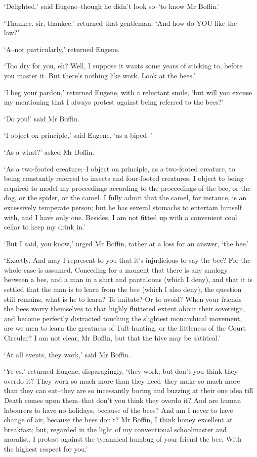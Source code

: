 ‘Delighted,’ said Eugene--though he didn’t look so--‘to know Mr Boffin.’

‘Thankee, sir, thankee,’ returned that gentleman. ‘And how do YOU like
the law?’

‘A--not particularly,’ returned Eugene.

‘Too dry for you, eh? Well, I suppose it wants some years of sticking
to, before you master it. But there’s nothing like work. Look at the
bees.’

‘I beg your pardon,’ returned Eugene, with a reluctant smile, ‘but will
you excuse my mentioning that I always protest against being referred to
the bees?’

‘Do you!’ said Mr Boffin.

‘I object on principle,’ said Eugene, ‘as a biped--’

‘As a what?’ asked Mr Boffin.

‘As a two-footed creature;--I object on principle, as a two-footed
creature, to being constantly referred to insects and four-footed
creatures. I object to being required to model my proceedings according
to the proceedings of the bee, or the dog, or the spider, or the camel.
I fully admit that the camel, for instance, is an excessively temperate
person; but he has several stomachs to entertain himself with, and I
have only one. Besides, I am not fitted up with a convenient cool cellar
to keep my drink in.’

‘But I said, you know,’ urged Mr Boffin, rather at a loss for an answer,
‘the bee.’

‘Exactly. And may I represent to you that it’s injudicious to say the
bee? For the whole case is assumed. Conceding for a moment that there is
any analogy between a bee, and a man in a shirt and pantaloons (which
I deny), and that it is settled that the man is to learn from the bee
(which I also deny), the question still remains, what is he to learn?
To imitate? Or to avoid? When your friends the bees worry themselves to
that highly fluttered extent about their sovereign, and become perfectly
distracted touching the slightest monarchical movement, are we men to
learn the greatness of Tuft-hunting, or the littleness of the
Court Circular? I am not clear, Mr Boffin, but that the hive may be
satirical.’

‘At all events, they work,’ said Mr Boffin.

‘Ye-es,’ returned Eugene, disparagingly, ‘they work; but don’t you think
they overdo it? They work so much more than they need--they make so much
more than they can eat--they are so incessantly boring and buzzing at
their one idea till Death comes upon them--that don’t you think they
overdo it? And are human labourers to have no holidays, because of the
bees? And am I never to have change of air, because the bees don’t? Mr
Boffin, I think honey excellent at breakfast; but, regarded in the light
of my conventional schoolmaster and moralist, I protest against the
tyrannical humbug of your friend the bee. With the highest respect for
you.’


